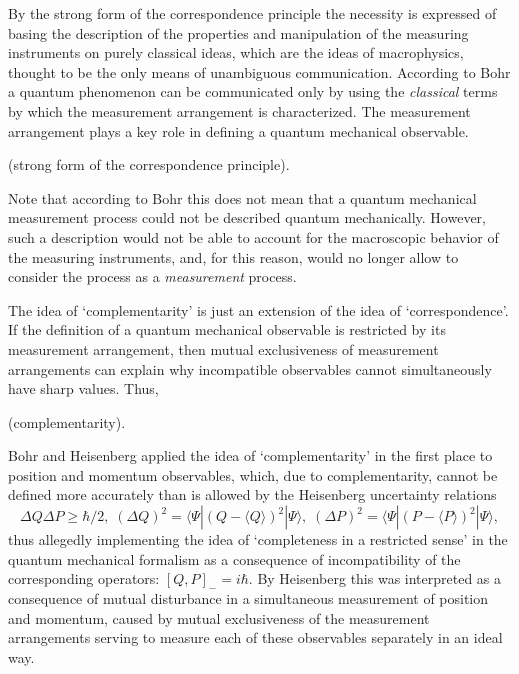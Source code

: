 \documentclass[12pt]{article}
\begin{document}
By the strong form of the correspondence principle the necessity
is expressed of basing the description of the properties and
manipulation of the measuring instruments on purely classical
ideas, which are the ideas of macrophysics, thought to be the
only means of unambiguous communication. According to Bohr a
quantum phenomenon can be communicated only by using the {\em
classical} terms by which the measurement arrangement is
characterized. The measurement arrangement plays a
key role in defining a quantum mechanical observable.

 (strong form of
the correspondence principle).

\noindent Note that according to Bohr this does not mean that a
quantum mechanical measurement process could not be described
quantum mechanically. However, such a description would not be
able to account for the macroscopic behavior of the measuring
instruments, and, for this reason, would no longer allow to
consider the process as a {\em measurement} process.

The idea of `complementarity' is just an extension of the idea of
`correspondence'. If the definition of a quantum mechanical
observable is restricted by its measurement arrangement, then
mutual exclusiveness of measurement arrangements can explain why
incompatible observables cannot simultaneously have sharp values.
Thus,

 (complementarity).

\noindent Bohr and Heisenberg applied the idea of
`complementarity' in the first place to position and momentum
observables, which, due to complementarity, cannot be defined more
accurately than is allowed by the Heisenberg uncertainty relations
\begin{equation}\label{7}
\Delta Q\Delta P\geq \hbar/2,\;(\Delta Q)^2= \langle
\Psi|(Q-\langle Q\rangle)^2|\Psi\rangle,\;(\Delta P)^2= \langle
\Psi|(P-\langle P\rangle)^2|\Psi\rangle,
\end{equation}
thus allegedly implementing the idea of `completeness in a
restricted sense' in the quantum mechanical formalism as a
consequence of incompatibility of the corresponding operators:
$[Q,P]_-=i\hbar$. By Heisenberg this was interpreted as a
consequence of mutual disturbance in a simultaneous measurement of
position and momentum, caused by mutual exclusiveness of the
measurement arrangements serving to measure each of these
observables separately in an ideal way.
\end{document}
